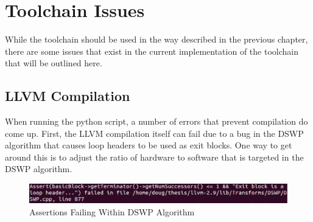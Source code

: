 \chapter{Toolchain Issues \label{chap:Issues}}
While the toolchain should be used in the way described in the previous chapter, there are some issues that exist in the current implementation of the toolchain that will be outlined here.
\section{LLVM Compilation}
When running the python script, a number of errors that prevent compilation do come up. First, the LLVM compilation itself can fail due to a bug in the DSWP algorithm that causes loop headers to be used as exit blocks. One way to get around this is to adjust the ratio of hardware to software that is targeted in the DSWP algorithm.

\begin{figure}
	\centering
		\includegraphics[width=\textwidth]{figures/DSWP_Compilation_Failure}
	\caption{Assertions Failing Within DSWP Algorithm\label{fig:dswp_compile_fail}}
\end{figure}